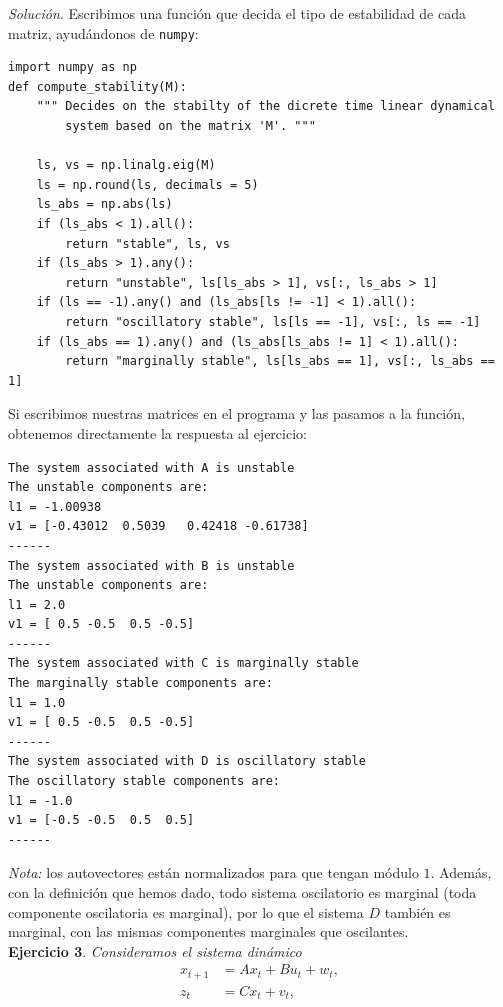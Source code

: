 \documentclass[11pt,a4paper]{article}
\begin{document}
\textit{Solución}. Escribimos una función que decida el tipo de estabilidad de cada matriz, ayudándonos de \verb|numpy|:

\begin{verbatim}
import numpy as np
def compute_stability(M):
    """ Decides on the stabilty of the dicrete time linear dynamical
        system based on the matrix 'M'. """

    ls, vs = np.linalg.eig(M)
    ls = np.round(ls, decimals = 5)
    ls_abs = np.abs(ls)
    if (ls_abs < 1).all():
        return "stable", ls, vs
    if (ls_abs > 1).any():
        return "unstable", ls[ls_abs > 1], vs[:, ls_abs > 1]
    if (ls == -1).any() and (ls_abs[ls != -1] < 1).all():
        return "oscillatory stable", ls[ls == -1], vs[:, ls == -1]
    if (ls_abs == 1).any() and (ls_abs[ls_abs != 1] < 1).all():
        return "marginally stable", ls[ls_abs == 1], vs[:, ls_abs == 1]
\end{verbatim}

Si escribimos nuestras matrices en el programa y las pasamos a la función, obtenemos directamente la respuesta al ejercicio:
\begin{verbatim}
The system associated with A is unstable
The unstable components are:
l1 = -1.00938
v1 = [-0.43012  0.5039   0.42418 -0.61738]
------
The system associated with B is unstable
The unstable components are:
l1 = 2.0
v1 = [ 0.5 -0.5  0.5 -0.5]
------
The system associated with C is marginally stable
The marginally stable components are:
l1 = 1.0
v1 = [ 0.5 -0.5  0.5 -0.5]
------
The system associated with D is oscillatory stable
The oscillatory stable components are:
l1 = -1.0
v1 = [-0.5 -0.5  0.5  0.5]
------
\end{verbatim}

\textit{Nota:} los autovectores están normalizados para que tengan módulo $1$. Además, con la definición que hemos dado, todo sistema oscilatorio es marginal (toda componente oscilatoria es marginal), por lo que el sistema $D$ también es marginal, con las mismas componentes marginales que oscilantes.\\

\textbf{Ejercicio 3}. \textit{Consideramos el sistema dinámico}
\begin{align*}
  x_{t+1}&=Ax_t + Bu_t + w_t,\\
  z_t &=Cx_t + v_t,
\end{align*}
\end{document}
